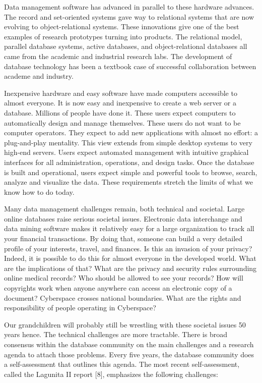 \documentclass[a4paper,12pt,notitlepage,twoside,openright]{article}
\begin{document}
Data management software has advanced in parallel to these hardware
advances. The record and set-oriented systems gave way to relational
systems that are now evolving to object-relational systems. These
innovations give one of the best examples of research prototypes turning
into products. The relational model, parallel database systems, active
databases, and object-relational databases all came from the academic
and industrial research labs. The development of database technology has
been a textbook case of successful collaboration between academe and
industry.

Inexpensive hardware and easy software have made computers accessible to
almost everyone. It is now easy and inexpensive to create a web server
or a database. Millions of people have done it. These users expect
computers to automatically design and manage themselves. These users do
not want to be computer operators. They expect to add new applications
with almost no effort: a plug-and-play mentality. This view extends from
simple desktop systems to very high-end servers. Users expect automated
management with intuitive graphical interfaces for all administration,
operations, and design tasks. Once the database is built and
operational, users expect simple and powerful tools to browse, search,
analyze and visualize the data. These requirements stretch the limits of
what we know how to do today.

Many data management challenges remain, both technical and societal.
Large online databases raise serious societal issues. Electronic data
interchange and data mining software makes it relatively easy for a
large organization to track all your financial transactions. By doing
that, someone can build a very detailed profile of your interests,
travel, and finances. Is this an invasion of your privacy? Indeed, it is
possible to do this for almost everyone in the developed world. What are
the implications of that? What are the privacy and security rules
surrounding online medical records? Who should be allowed to see your
records? How will copyrights work when anyone anywhere can access an
electronic copy of a document? Cyberspace crosses national boundaries.
What are the rights and responsibility of people operating in
Cyberspace?

Our grandchildren will probably still be wrestling with these societal
issues 50 years hence. The technical challenges are more tractable.
There is broad consensus within the database community on the main
challenges and a research agenda to attach those problems. Every five
years, the database community does a self-assessment that outlines this
agenda. The most recent self-assessment, called the Lagunita II report
{[}8{]}, emphasizes the following challenges:
\end{document}
